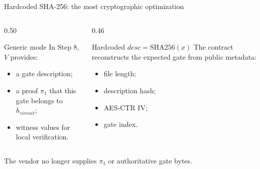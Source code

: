 \documentclass[aspectratio=169,10pt]{beamer}
\begin{document}
\begin{frame}{Hardcoded SHA-256: the most cryptographic optimization}
  \begin{columns}[T,onlytextwidth]
    \begin{column}{0.50\textwidth}
      \begin{block}{Generic mode}
        In Step 8, \(V\) provides:
        \begin{itemize}
          \item a gate description;
          \item a proof \(\pi_1\) that this gate belongs to \(h_{\mathit{circuit}}\);
          \item witness values for local verification.
        \end{itemize}
      \end{block}
    \end{column}
    \begin{column}{0.46\textwidth}
      \begin{block}{Hardcoded \(desc=\mathrm{SHA256}(x)\)}
        The contract reconstructs the expected gate from public metadata:
        \begin{itemize}
          \item file length;
          \item description hash;
          \item AES-CTR IV;
          \item gate index.
        \end{itemize}
      \end{block}
    \end{column}
  \end{columns}
  \vfill
  \centering
  \Large \alert{The vendor no longer supplies \(\pi_1\) or authoritative gate bytes.}
\end{frame}
\end{document}
